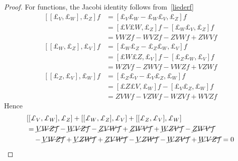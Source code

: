 \begin{proof}
        For functions, the Jacobi identity follows from~\eqref{liederf}
        \begin{equation*}
        \begin{aligned}
            [[\pounds_V, \pounds_W], \pounds_Z] f & = [\pounds_V \pounds_W - \pounds_W \pounds_V, \pounds_Z ] f \\ & = [\pounds V \pounds W, \pounds_Z] f - [\pounds_W \pounds_V, \pounds_Z] f \\ & = V W Z f - W V Z f - Z V W f + Z W V f
        \end{aligned}
        \end{equation*}
        \begin{equation*}
        \begin{aligned}
            [[\pounds_W, \pounds_Z], \pounds_V] f & = [\pounds_W \pounds_Z - \pounds_Z \pounds_W, \pounds_V ] f \\ & = [\pounds W \pounds Z, \pounds_V] f - [\pounds_Z \pounds_W, \pounds_V] f \\ & = W Z V f - Z W V f - V W Z f + V Z W f 
        \end{aligned}
        \end{equation*}
        \begin{equation*}
        \begin{aligned}
            [[\pounds_Z, \pounds_V], \pounds_W] f & = [\pounds_Z \pounds_V - \pounds_V \pounds_Z, \pounds_W ] f \\ & = [\pounds Z \pounds V, \pounds_W] f - [\pounds_V \pounds_Z, \pounds_W] f \\ & = Z V W f - V Z W f - W Z V f + W V Z f
        \end{aligned}
        \end{equation*}
        Hence 
        \begin{equation*}
        \begin{aligned}
            & [[\pounds_V, \pounds_W], \pounds_Z] + [[\pounds_W, \pounds_Z], \pounds_V] + [[\pounds_Z, \pounds_V], \pounds_W] \\ & = \cancel{V W Z f} - \cancel{W V Z f} - \cancel{Z V W f} + \cancel{Z W V f} + \cancel{W Z V f} - \cancel{Z W V f} \\ & \quad - \cancel{V W Z f} + \cancel{V Z W f} + \cancel{Z V W f} - \cancel{V Z W f} - \cancel{W Z V f} + \cancel{W V Z f} = 0
        \end{aligned}
        \end{equation*}
        

\end{proof}

